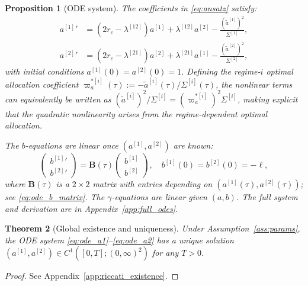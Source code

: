 \documentclass[11pt,a4paper]{article}
\numberwithin{equation}{section}
\newtheorem{theorem}{Theorem}[section]
\newtheorem{proposition}[theorem]{Proposition}
\begin{document}
\begin{proposition}[ODE system]\label{prop:ode_system}
The coefficients in \eqref{eq:ansatz} satisfy:
\begin{align}
{a^{[1]}}' &= (2r_c - \lambda^{[12]}) a^{[1]} + \lambda^{[12]} a^{[2]} - \frac{(\tilde{a}^{[1]})^2}{\Sigma^{[1]}}, \label{eq:ode_a1} \\
{a^{[2]}}' &= (2r_c - \lambda^{[21]}) a^{[2]} + \lambda^{[21]} a^{[1]} - \frac{(\tilde{a}^{[2]})^2}{\Sigma^{[2]}}, \label{eq:ode_a2}
\end{align}
with initial conditions $a^{[1]}(0) = a^{[2]}(0) = 1$. Defining the regime-$i$ optimal allocation coefficient $\varpi^{*[i]}_a(\tau) := -\tilde{a}^{[i]}(\tau)/\Sigma^{[i]}(\tau)$, the nonlinear terms can equivalently be written as $(\tilde{a}^{[i]})^2/\Sigma^{[i]} = (\varpi^{*[i]}_a)^2 \Sigma^{[i]}$, making explicit that the quadratic nonlinearity arises from the regime-dependent optimal allocation.

The $b$-equations are linear once $(a^{[1]}, a^{[2]})$ are known:
\begin{equation}\label{eq:ode_b_main}
\begin{pmatrix} {b^{[1]}}' \\ {b^{[2]}}' \end{pmatrix} = \mathbf{B}(\tau) \begin{pmatrix} b^{[1]} \\ b^{[2]} \end{pmatrix}, \quad b^{[1]}(0) = b^{[2]}(0) = -\ell,
\end{equation}
where $\mathbf{B}(\tau)$ is a $2 \times 2$ matrix with entries depending on $(a^{[1]}(\tau), a^{[2]}(\tau))$; see \eqref{eq:ode_b_matrix}. The $\gamma$-equations are linear given $(a, b)$. The full system and derivation are in Appendix~\ref{app:full_odes}.
\end{proposition}

\begin{theorem}[Global existence and uniqueness]\label{thm:riccati_existence}
Under Assumption~\ref{ass:params}, the ODE system \eqref{eq:ode_a1}--\eqref{eq:ode_a2} has a unique solution $(a^{[1]}, a^{[2]}) \in C^1([0,T]; (0,\infty)^2)$ for any $T > 0$.
\end{theorem}

\begin{proof}
See Appendix~\ref{app:riccati_existence}.
\end{proof}
\end{document}
